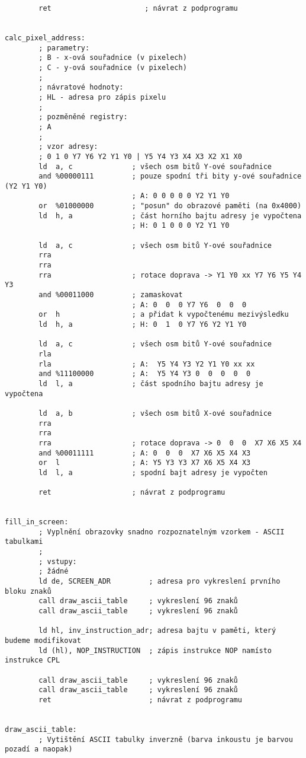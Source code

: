 \documentclass{article}
\begin{document}
\begin{verbatim}
        ret                      ; návrat z podprogramu
 
 
calc_pixel_address:
        ; parametry:
        ; B - x-ová souřadnice (v pixelech)
        ; C - y-ová souřadnice (v pixelech)
        ;
        ; návratové hodnoty:
        ; HL - adresa pro zápis pixelu
        ;
        ; pozměněné registry:
        ; A
        ;
        ; vzor adresy:
        ; 0 1 0 Y7 Y6 Y2 Y1 Y0 | Y5 Y4 Y3 X4 X3 X2 X1 X0
        ld  a, c              ; všech osm bitů Y-ové souřadnice
        and %00000111         ; pouze spodní tři bity y-ové souřadnice (Y2 Y1 Y0)
                              ; A: 0 0 0 0 0 Y2 Y1 Y0
        or  %01000000         ; "posun" do obrazové paměti (na 0x4000)
        ld  h, a              ; část horního bajtu adresy je vypočtena
                              ; H: 0 1 0 0 0 Y2 Y1 Y0
 
        ld  a, c              ; všech osm bitů Y-ové souřadnice
        rra
        rra
        rra                   ; rotace doprava -> Y1 Y0 xx Y7 Y6 Y5 Y4 Y3
        and %00011000         ; zamaskovat
                              ; A: 0  0  0 Y7 Y6  0  0  0
        or  h                 ; a přidat k vypočtenému mezivýsledku
        ld  h, a              ; H: 0  1  0 Y7 Y6 Y2 Y1 Y0
 
        ld  a, c              ; všech osm bitů Y-ové souřadnice
        rla
        rla                   ; A:  Y5 Y4 Y3 Y2 Y1 Y0 xx xx
        and %11100000         ; A:  Y5 Y4 Y3 0  0  0  0  0
        ld  l, a              ; část spodního bajtu adresy je vypočtena
 
        ld  a, b              ; všech osm bitů X-ové souřadnice
        rra
        rra
        rra                   ; rotace doprava -> 0  0  0  X7 X6 X5 X4
        and %00011111         ; A: 0  0  0  X7 X6 X5 X4 X3
        or  l                 ; A: Y5 Y3 Y3 X7 X6 X5 X4 X3
        ld  l, a              ; spodní bajt adresy je vypočten
 
        ret                   ; návrat z podprogramu
 
 
fill_in_screen:
        ; Vyplnění obrazovky snadno rozpoznatelným vzorkem - ASCII tabulkami
        ;
        ; vstupy:
        ; žádné
        ld de, SCREEN_ADR         ; adresa pro vykreslení prvního bloku znaků
        call draw_ascii_table     ; vykreslení 96 znaků
        call draw_ascii_table     ; vykreslení 96 znaků
 
        ld hl, inv_instruction_adr; adresa bajtu v paměti, který budeme modifikovat
        ld (hl), NOP_INSTRUCTION  ; zápis instrukce NOP namísto instrukce CPL
 
        call draw_ascii_table     ; vykreslení 96 znaků
        call draw_ascii_table     ; vykreslení 96 znaků
        ret                       ; návrat z podprogramu
 
 
draw_ascii_table:
        ; Vytištění ASCII tabulky inverzně (barva inkoustu je barvou pozadí a naopak)

\end{verbatim}
\end{document}

